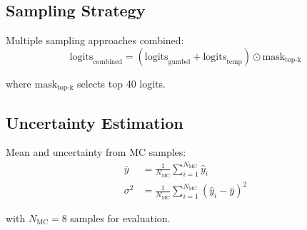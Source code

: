 \documentclass{article}
\begin{document}
\subsection{Sampling Strategy}
Multiple sampling approaches combined:
\begin{equation}
\text{logits}_{\text{combined}} = (\text{logits}_{\text{gumbel}} + \text{logits}_{\text{temp}}) \odot \text{mask}_{\text{top-k}}
\end{equation}

where $\text{mask}_{\text{top-k}}$ selects top 40 logits.

\subsection{Uncertainty Estimation}
Mean and uncertainty from MC samples:
\begin{align*}
\bar{y} &= \frac{1}{N_{\text{MC}}}\sum_{i=1}^{N_{\text{MC}}} \hat{y}_i \\
\sigma^2 &= \frac{1}{N_{\text{MC}}}\sum_{i=1}^{N_{\text{MC}}}(\hat{y}_i - \bar{y})^2
\end{align*}

with $N_{\text{MC}}=8$ samples for evaluation.



\end{document}
